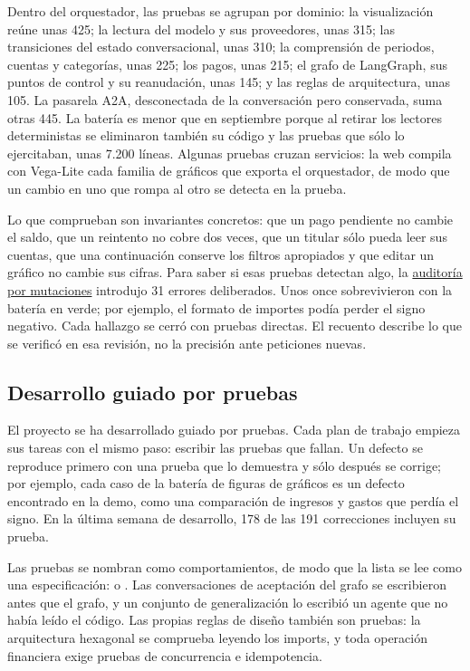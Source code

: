 \documentclass[12pt,a4paper]{article}
\begin{document}
Dentro del orquestador, las pruebas se agrupan por dominio: la visualización reúne unas 425; la lectura del modelo y sus proveedores, unas 315; las transiciones del estado conversacional, unas 310; la comprensión de periodos, cuentas y categorías, unas 225; los pagos, unas 215; el grafo de LangGraph, sus puntos de control y su reanudación, unas 145; y las reglas de arquitectura, unas 105. La pasarela A2A, desconectada de la conversación pero conservada, suma otras 445. La batería es menor que en septiembre porque al retirar los lectores deterministas se eliminaron también su código y las pruebas que sólo lo ejercitaban, unas 7.200 líneas. Algunas pruebas cruzan servicios: la web compila con Vega-Lite cada familia de gráficos que exporta el orquestador, de modo que un cambio en uno que rompa al otro se detecta en la prueba.

Lo que comprueban son invariantes concretos: que un pago pendiente no cambie el saldo, que un reintento no cobre dos veces, que un titular sólo pueda leer sus cuentas, que una continuación conserve los filtros apropiados y que editar un gráfico no cambie sus cifras. Para saber si esas pruebas detectan algo, la \href{https://github.com/adrianoggm/FinGuard/blob/main/docs/audits/2026-08-28-do-the-tests-prove-anything.md}{auditoría por mutaciones} introdujo 31 errores deliberados. Unos once sobrevivieron con la batería en verde; por ejemplo, el formato de importes podía perder el signo negativo. Cada hallazgo se cerró con pruebas directas. El recuento describe lo que se verificó en esa revisión, no la precisión ante peticiones nuevas.

\subsection{Desarrollo guiado por pruebas}
El proyecto se ha desarrollado guiado por pruebas. Cada plan de trabajo empieza sus tareas con el mismo paso: escribir las pruebas que fallan. Un defecto se reproduce primero con una prueba que lo demuestra y sólo después se corrige; por ejemplo, cada caso de la batería de figuras de gráficos es un defecto encontrado en la demo, como una comparación de ingresos y gastos que perdía el signo. En la última semana de desarrollo, 178 de las 191 correcciones incluyen su prueba.

Las pruebas se nombran como comportamientos, de modo que la lista se lee como una especificación:  o . Las conversaciones de aceptación del grafo se escribieron antes que el grafo, y un conjunto de generalización lo escribió un agente que no había leído el código. Las propias reglas de diseño también son pruebas: la arquitectura hexagonal se comprueba leyendo los imports, y toda operación financiera exige pruebas de concurrencia e idempotencia.
\end{document}
